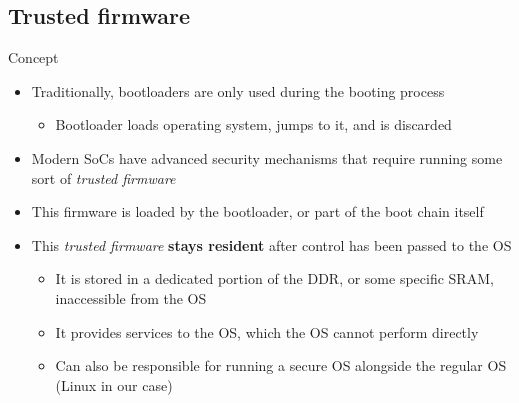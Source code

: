 \subsection{Trusted firmware}

\begin{frame}{Concept}
  \begin{itemize}
  \item Traditionally, bootloaders are only used during the booting
    process
    \begin{itemize}
    \item Bootloader loads operating system, jumps to it, and is
      discarded
    \end{itemize}
  \item Modern SoCs have advanced security mechanisms that require
    running some sort of {\em trusted firmware}
  \item This firmware is loaded by the bootloader, or part of the boot
    chain itself
  \item This {\em trusted firmware} {\bf stays resident} after control
    has been passed to the OS
    \begin{itemize}
    \item It is stored in a dedicated portion of the DDR, or some
      specific SRAM, inaccessible from the OS
    \item It provides services to the OS, which the OS cannot perform
      directly
    \item Can also be responsible for running a secure OS alongside the
      regular OS (Linux in our case)
    \end{itemize}
  \end{itemize}
\end{frame}

